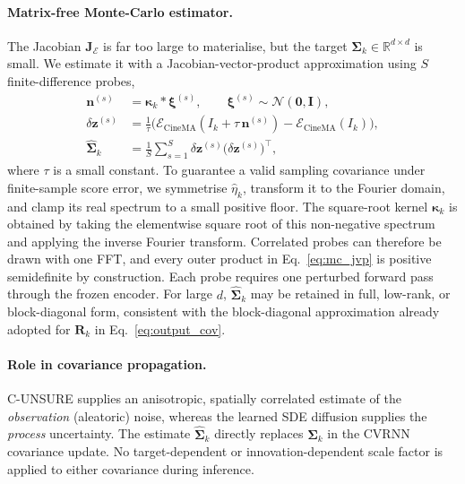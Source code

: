 \documentclass[10pt,twocolumn]{article}
\newcommand{\R}{\mathbb{R}}
\begin{document}
\paragraph{Matrix-free Monte-Carlo estimator.}
The Jacobian $\bm{J}_{\mathcal{E}}$ is far too large to materialise, but the target $\bm{\Sigma}_k \in \R^{d \times d}$ is small. We estimate it with a Jacobian-vector-product approximation using $S$ finite-difference probes,
\begin{align}
    \bm{n}^{(s)} &= \bm{\kappa}_k \ast \bm{\xi}^{(s)},
        \qquad \bm{\xi}^{(s)} \sim \mathcal{N}(\bm{0}, \bm{I}), \\
    \delta\bm{z}^{(s)} &= \frac{1}{\tau}
        \Big( \mathcal{E}_{\text{CineMA}}(I_k + \tau\, \bm{n}^{(s)})
              - \mathcal{E}_{\text{CineMA}}(I_k) \Big), \\
    \hat{\bm{\Sigma}}_k &= \frac{1}{S} \sum_{s=1}^{S}
        \delta\bm{z}^{(s)} \big(\delta\bm{z}^{(s)}\big)^{\top},
    \label{eq:mc_jvp}
\end{align}
where $\tau$ is a small constant. To guarantee a valid sampling covariance under finite-sample score error, we symmetrise $\hat{\eta}_k$, transform it to the Fourier domain, and clamp its real spectrum to a small positive floor. The square-root kernel $\bm{\kappa}_k$ is obtained by taking the elementwise square root of this non-negative spectrum and applying the inverse Fourier transform. Correlated probes can therefore be drawn with one FFT, and every outer product in Eq.~\eqref{eq:mc_jvp} is positive semidefinite by construction. Each probe requires one perturbed forward pass through the frozen encoder. For large $d$, $\hat{\bm{\Sigma}}_k$ may be retained in full, low-rank, or block-diagonal form, consistent with the block-diagonal approximation already adopted for $\bm{R}_k$ in Eq.~\eqref{eq:output_cov}.

\paragraph{Role in covariance propagation.}
C-UNSURE supplies an anisotropic, spatially correlated estimate of the \emph{observation} (aleatoric) noise, whereas the learned SDE diffusion supplies the \emph{process} uncertainty. The estimate $\hat{\bm{\Sigma}}_k$ directly replaces $\bm{\Sigma}_k$ in the CVRNN covariance update. No target-dependent or innovation-dependent scale factor is applied to either covariance during inference.
\end{document}
